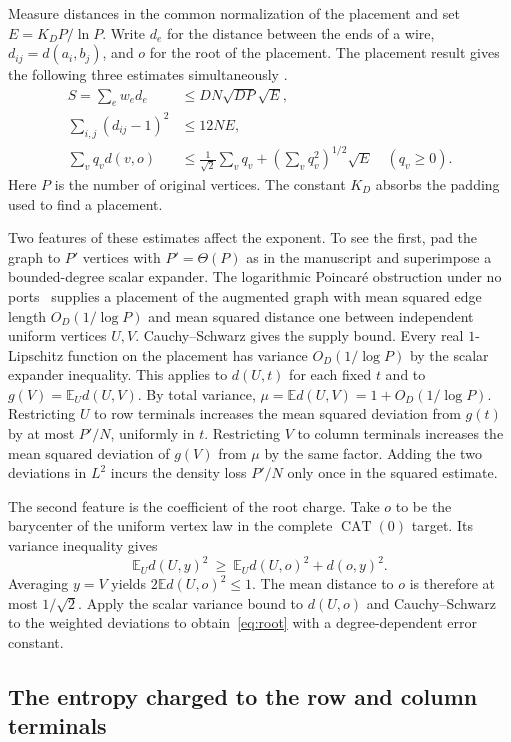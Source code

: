\documentclass[11pt]{article}
\begin{document}
Measure distances in the common normalization of the placement and set
$E=K_D P/\ln P$. Write $d_e$ for the distance between the ends of a
wire, $d_{ij}=d(a_i,b_j)$, and $o$ for the root of the placement.
The placement result gives the following three estimates simultaneously
\cite{partial,formalgeom}.
\begin{align}
 S=\sum_e w_e d_e &\le DN\sqrt{DP}\sqrt E, \label{eq:supply}\\
 \sum_{i,j}(d_{ij}-1)^2 &\le 12NE, \label{eq:terminals}\\
 \sum_v q_v d(v,o)&\le \frac{1}{\sqrt2}\sum_v q_v
               +\left(\sum_v q_v^2\right)^{1/2}\sqrt E
               \quad(q_v\ge0). \label{eq:root}
\end{align}
Here $P$ is the number of original vertices. The constant $K_D$ absorbs
the padding used to find a placement.

Two features of these estimates affect the exponent. To see the first,
pad the graph to $P'$ vertices with $P'=\Theta(P)$ as in the manuscript
and superimpose a bounded-degree scalar expander. The logarithmic
Poincar\'e obstruction under no ports~\cite{loggraph} supplies a
placement of the augmented graph with mean squared edge length
$O_D(1/\log P)$ and mean squared distance one between independent
uniform vertices $U,V$. Cauchy--Schwarz gives the supply bound.
Every real $1$-Lipschitz function on the placement has variance
$O_D(1/\log P)$ by the scalar expander inequality. This applies to
$d(U,t)$ for each fixed $t$ and to $g(V)=\mathbb E_U d(U,V)$.
By total variance, $\mu=\mathbb E d(U,V)=1+O_D(1/\log P)$.
Restricting $U$ to row terminals increases the mean squared deviation
from $g(t)$ by at most $P'/N$, uniformly in $t$. Restricting $V$ to
column terminals increases the mean squared deviation of $g(V)$ from
$\mu$ by the same factor. Adding the two deviations in $L^2$ incurs
the density loss $P'/N$ only once in the squared estimate.

The second feature is the coefficient of the root charge. Take $o$
to be the barycenter of the uniform vertex law in the complete
$\operatorname{CAT}(0)$ target. Its variance inequality gives
\[
 \mathbb E_U d(U,y)^2\ \ge\ \mathbb E_U d(U,o)^2+d(o,y)^2.
\]
Averaging $y=V$ yields $2\mathbb E d(U,o)^2\le1$. The mean distance
to $o$ is therefore at most $1/\sqrt2$. Apply the scalar variance
bound to $d(U,o)$ and Cauchy--Schwarz to the weighted deviations to
obtain~\eqref{eq:root} with a degree-dependent error constant.

\subsection{The entropy charged to the row and column terminals}
\end{document}
